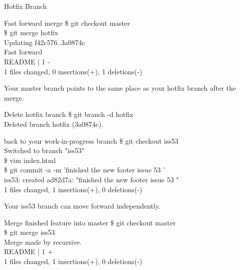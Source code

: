 \documentclass{beamer}
\begin{document}
\begin{frame}{Hotfix Branch}
    \centering
    \hfill\vfill
\end{frame}

\begin{frame}{Fast forward merge}
  \$ git checkout master\\
  \$ git merge hotfix\\
  Updating f42c576..3a0874c\\
  Fast forward\\
   README |    1 -\\
   1 files changed, 0 insertions(+), 1 deletions(-)
\end{frame}


\begin{frame}{Your master branch points to the same place as your hotfix branch after the merge.}
    \centering
    \hfill\vfill
\end{frame}

\begin{frame}{Delete hotfix branch}
  \$ git branch -d hotfix\\
  Deleted branch hotfix (3a0874c).
\end{frame}

\begin{frame}{back to your work-in-progress branch}
  \$ git checkout iss53\\
  Switched to branch "iss53"\\
  \$ vim index.html\\
  \$ git commit -a -m 'finished the new footer  issue 53 '\\
  iss53: created ad82d7a: "finished the new footer  issue 53 "\\
   1 files changed, 1 insertions(+), 0 deletions(-)
\end{frame}

\begin{frame}{Your iss53 branch can move forward independently.}
    \centering
    \hfill\vfill
\end{frame}

\begin{frame}{Merge finished feature into master}
  \$ git checkout master\\
  \$ git merge iss53\\
  Merge made by recursive.\\
   README |    1 +\\
   1 files changed, 1 insertions(+), 0 deletions(-)
\end{frame}
\end{document}
